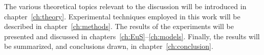 The various theoretical topics relevant to the discussion will be introduced in chapter~\ref{ch:theory}. Experimental techniques employed in this work will be described in chapter~\ref{ch:methods}. The results of the experiments will be presented and discussed in chapters~\ref{ch:EuS}--\ref{ch:models}. Finally, the results will be summarized, and conclusions drawn, in chapter~\ref{ch:conclusion}.
